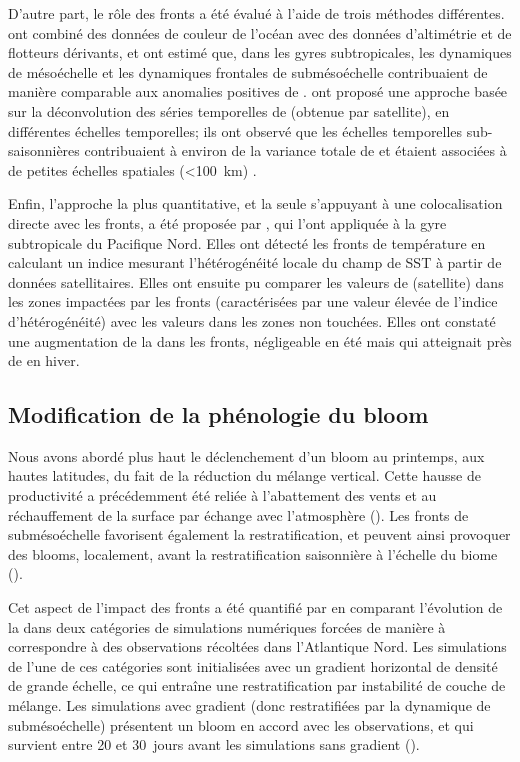 D'autre part, le rôle des fronts a été évalué à l'aide de trois méthodes différentes.
\Textcite{guo_2019} ont combiné des données de couleur de l'océan avec des données d'altimétrie et de flotteurs dérivants, et ont estimé que, dans les gyres subtropicales, les dynamiques de mésoéchelle et les dynamiques frontales de submésoéchelle contribuaient de manière comparable aux anomalies positives de .
\Textcite{keerthi_2022} ont proposé une approche basée sur la déconvolution des séries temporelles de  (obtenue par satellite), en différentes échelles temporelles; ils ont observé que les échelles temporelles sub-saisonnières contribuaient à environ  de la variance totale de  et étaient associées à de petites échelles spatiales (\qty{<100}{\km}) .

Enfin, l'approche la plus quantitative, et la seule s'appuyant à une colocalisation directe avec les fronts, a été proposée par \textcite{liu_2016}, qui l'ont appliquée à la gyre subtropicale du Pacifique Nord.
Elles ont détecté les fronts de température en calculant un indice mesurant l'hétérogénéité locale du champ de SST à partir de données satellitaires.
Elles ont ensuite pu comparer les valeurs de  (satellite) dans les zones impactées par les fronts (caractérisées par une valeur élevée de l'indice d'hétérogénéité) avec les valeurs dans les zones non touchées.
Elles ont constaté une augmentation de la  dans les fronts, négligeable en été mais qui atteignait près de  en hiver.

\subsection{Modification de la phénologie du bloom}
\label{sec:modif-phenologie}

Nous avons abordé plus haut le déclenchement d'un bloom au printemps, aux hautes latitudes, du fait de la réduction du mélange vertical.
Cette hausse de productivité a précédemment été reliée à l'abattement des vents et au réchauffement de la surface par échange avec l'atmosphère (\cite{henson_2006,taylor_2011a}).
Les fronts de submésoéchelle favorisent également la restratification, et peuvent ainsi provoquer des blooms, localement, avant la restratification saisonnière à l'échelle du biome (\cite{taylor_2011,karleskind_2011,mahadevan_2012}).

Cet aspect de l'impact des fronts a été quantifié par \textcite{mahadevan_2012} en comparant l'évolution de la  dans deux catégories de simulations numériques forcées de manière à correspondre à des observations récoltées dans l'Atlantique Nord. Les simulations de l'une de ces catégories sont initialisées avec un gradient horizontal de densité de grande échelle, ce qui entraîne une restratification par instabilité de couche de mélange.
Les simulations avec gradient (donc restratifiées par la dynamique de submésoéchelle) présentent un bloom en accord avec les observations, et qui survient entre 20 et 30~jours avant les simulations sans gradient ().

